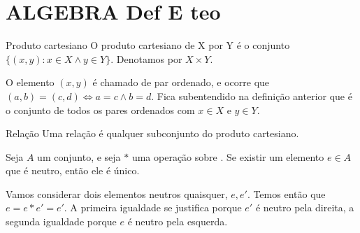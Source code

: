 \documentclass[../main.tex]{subfiles}
\begin{document}
\chapter{ALGEBRA Def E teo}

\begin{defi}{Produto cartesiano}
    O produto cartesiano de X por Y é o conjunto $\{(x,y) : x \in X \land y \in Y\}$. Denotamos por $X \times Y$.
\end{defi}
\begin{obs}
    O elemento $(x,y)$ é chamado de par ordenado, e ocorre que $(a,b) = (c,d) \iff a = c \land b = d$. Fica subentendido na definição anterior que é o conjunto de todos os pares ordenados com $x \in X$ e $y \in Y$.
\end{obs}

\begin{defi}{Relação}
    Uma relação é qualquer subconjunto do produto cartesiano.
\end{defi}

\begin{teo}\label{agb-neutro-unico}
    Seja $A$ um conjunto, e seja $*$ uma operação sobre \N. Se existir um elemento $e \in A$ que é neutro, então ele é único.
\end{teo}
\begin{dem}
    Vamos considerar dois elementos neutros quaisquer, $e, e'$. 
    Temos então que $e = e * e' = e'$. A primeira igualdade se justifica porque $e'$ é neutro pela direita, a segunda igualdade porque $e$ é neutro pela esquerda.
\end{dem}
\end{document}
